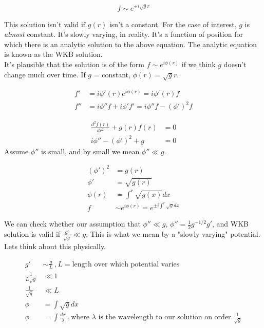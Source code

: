 \documentclass[10pt,letterpaper,final]{book}
\begin{document}
\begin{align}
f \sim e^{\pm i \sqrt{g} r}
\end{align}

This solution isn't valid if $g(r)$ isn't a constant. For the case of interest, $g$ is \textit{almost} constant. It's slowly varying, in reality. It's a function of position for which there is an analytic solution to the above equation. The analytic equation is known as the WKB solution.\\

It's plausible that the solution is of the form $f \sim e^{i \phi(r)}$ if we think $g$ doesn't change much over time. If $g$ = constant, $\phi(r) = \sqrt{g} r$. 

\begin{align}
f' & = i \phi'(r)e^{i \phi(r)} = i \phi'(r)f\\
f'' & =i\phi''f + i \phi'f' = i \phi''f - (\phi')^2f
\end{align}

\begin{align}
\frac{d^2 f(r)}{dr^2} + g(r)f(r) & = 0\\
i\phi'' - (\phi')^2 + g&=0
\end{align}
Assume $\phi''$ is small, and by small we mean $\phi'' \ll g$. 

\begin{align}
(\phi')^2 &= g(r)\\
\phi' & = \sqrt{g(r)}\\
\phi(r) & = \int^r \sqrt{g(x)}dx\\
f & \sim e^{i\phi(r)} = e^{ \pm i\int^r \sqrt{g}dx}
\end{align}

We can check whether our assumption that $\phi'' \ll g$, $\phi'' = \frac{1}{2}g^{-1/2}g'$, and WKB solution is valid if $\frac{g'}{\sqrt{g}} \ll g$. This is what we mean by a "slowly varying" potential. Lets think about this physically. 

\begin{align}
g' &\sim \frac{g}{L}~,L = \text{length over which potential varies}\\
\frac{1}{L\sqrt{g}} &\ll 1\\
\frac{1}{\sqrt{g}} & \ll L\\
\phi &= \int \sqrt{g}dx\\
\phi &= \int \frac{dx}{\lambda}~,\text{where $\lambda$ is the wavelength to our solution on order $\frac{1}{\sqrt{g}}$}
\end{align}
\end{document}
